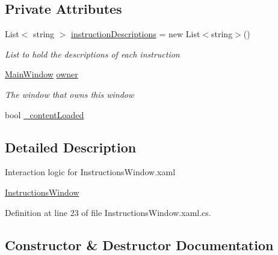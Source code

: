 \subsection*{Private Attributes}
\begin{DoxyCompactItemize}
\item 
List$<$ string $>$ \hyperlink{class_c_p_u___o_s___simulator_1_1_instructions_window_a678ab4df2b78758142472eeed8c5d7ba}{instruction\+Descriptions} = new List$<$string$>$()
\begin{DoxyCompactList}\small\item\em List to hold the descriptions of each instruction \end{DoxyCompactList}\item 
\hyperlink{class_c_p_u___o_s___simulator_1_1_main_window}{Main\+Window} \hyperlink{class_c_p_u___o_s___simulator_1_1_instructions_window_a954c950c677c61a3b7ed7406b6dc7164}{owner}
\begin{DoxyCompactList}\small\item\em The window that owns this window \end{DoxyCompactList}\item 
bool \hyperlink{class_c_p_u___o_s___simulator_1_1_instructions_window_a7755282dffea134038e9e58c931dc297}{\+\_\+content\+Loaded}
\end{DoxyCompactItemize}


\subsection{Detailed Description}
Interaction logic for Instructions\+Window.\+xaml 

\hyperlink{class_c_p_u___o_s___simulator_1_1_instructions_window}{Instructions\+Window} 

Definition at line 23 of file Instructions\+Window.\+xaml.\+cs.



\subsection{Constructor \& Destructor Documentation}
\hypertarget{class_c_p_u___o_s___simulator_1_1_instructions_window_aa482ef12f9c98458bedcc3c07d696879}{}
